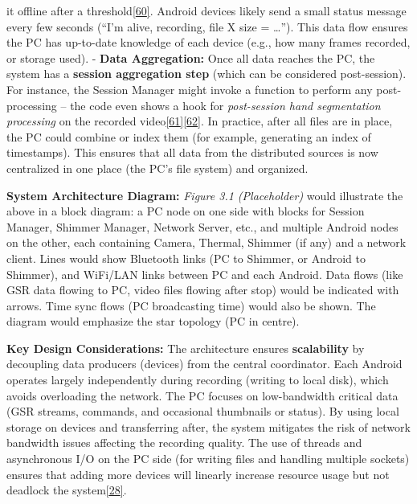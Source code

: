 \documentclass[12pt,a4paper]{article}
\begin{document}
it offline after a threshold\href{https://github.com/buccancs/bucika_gsr/blob/7048f7f6a7536f5cd577ed2184800d3dad97fd08/PythonApp/session/session_synchronizer.py\#L154-L161}{{[}60{]}}. Android devices likely send a small status message every few seconds (``I'm alive, recording, file X size = \ldots{}''). This data flow ensures the PC has up-to-date knowledge of each device (e.g., how many frames recorded, or storage used). - \textbf{Data Aggregation:} Once all data reaches the PC, the system has a \textbf{session aggregation step} (which can be considered post-session). For instance, the Session Manager might invoke a function to perform any post-processing -- the code even shows a hook for \emph{post-session hand segmentation processing} on the recorded video\href{https://github.com/buccancs/bucika_gsr/blob/7048f7f6a7536f5cd577ed2184800d3dad97fd08/PythonApp/session/session_manager.py\#L172-L180}{{[}61{]}}\href{https://github.com/buccancs/bucika_gsr/blob/7048f7f6a7536f5cd577ed2184800d3dad97fd08/PythonApp/session/session_manager.py\#L214-L222}{{[}62{]}}. In practice, after all files are in place, the PC could combine or index them (for example, generating an index of timestamps). This ensures that all data from the distributed sources is now centralized in one place (the PC's file system) and organized.

\textbf{System Architecture Diagram:} \emph{Figure 3.1 (Placeholder)} would illustrate the above in a block diagram: a PC node on one side with blocks for Session Manager, Shimmer Manager, Network Server, etc., and multiple Android nodes on the other, each containing Camera, Thermal, Shimmer (if any) and a network client. Lines would show Bluetooth links (PC to Shimmer, or Android to Shimmer), and WiFi/LAN links between PC and each Android. Data flows (like GSR data flowing to PC, video files flowing after stop) would be indicated with arrows. Time sync flows (PC broadcasting time) would also be shown. The diagram would emphasize the star topology (PC in centre).

\textbf{Key Design Considerations:} The architecture ensures \textbf{scalability} by decoupling data producers (devices) from the central coordinator. Each Android operates largely independently during recording (writing to local disk), which avoids overloading the network. The PC focuses on low-bandwidth critical data (GSR streams, commands, and occasional thumbnails or status). By using local storage on devices and transferring after, the system mitigates the risk of network bandwidth issues affecting the recording quality. The use of threads and asynchronous I/O on the PC side (for writing files and handling multiple sockets) ensures that adding more devices will linearly increase resource usage but not deadlock the system\href{https://github.com/buccancs/bucika_gsr/blob/7048f7f6a7536f5cd577ed2184800d3dad97fd08/PythonApp/shimmer_manager.py\#L169-L177}{{[}28{]}}.
\end{document}
